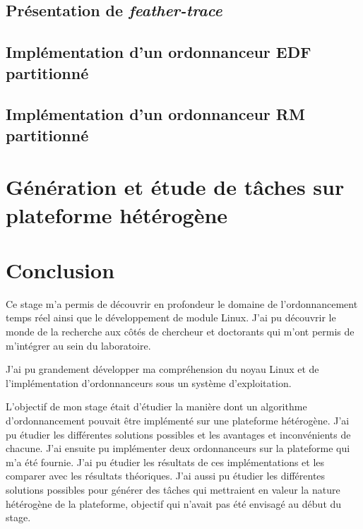 \documentclass{article}
\begin{document}
    
    \subsection{Présentation de \textit{feather-trace}}
    


    \subsection{Implémentation d'un ordonnanceur EDF partitionné}
    
    
    
    \subsection{Implémentation d'un ordonnanceur RM partitionné}

    
    
    
    \newpage
    \section[Génération de tâches]{Génération et étude de tâches sur plateforme hétérogène}

    


    \newpage
    \section{Conclusion}

    Ce stage m'a permis de découvrir en profondeur le domaine de l'ordonnancement temps réel ainsi que le développement de module Linux. J'ai pu découvrir le monde de la recherche aux côtés de chercheur et doctorants qui m'ont permis de m'intégrer au sein du laboratoire.
    
    J'ai pu grandement développer ma compréhension du noyau Linux et de l'implémentation d'ordonnanceurs sous un système d'exploitation. 

    L'objectif de mon stage était d'étudier la manière dont un algorithme d'ordonnancement pouvait être implémenté sur une plateforme hétérogène. J'ai pu étudier les différentes solutions possibles et les avantages et inconvénients de chacune. J'ai ensuite pu implémenter deux ordonnanceurs sur la plateforme qui m'a été fournie. J'ai pu étudier les résultats de ces implémentations et les comparer avec les résultats théoriques. J'ai aussi pu étudier les différentes solutions possibles pour générer des tâches qui mettraient en valeur la nature hétérogène de la plateforme, objectif qui n'avait pas été envisagé au début du stage.
\end{document}
